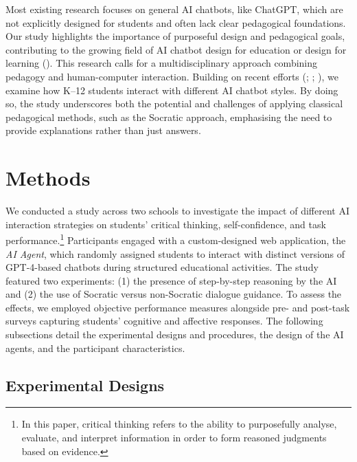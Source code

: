 \documentclass[
  12pt,
]{article}
\begin{document}
Most existing research focuses on general AI chatbots, like ChatGPT, which are not explicitly designed for students and often lack clear pedagogical foundations. Our study highlights the importance of purposeful design and pedagogical goals, contributing to the growing field of AI chatbot design for education or design for learning (). This research calls for a multidisciplinary approach combining pedagogy and human-computer interaction. Building on recent efforts (; ; ), we examine how K--12 students interact with different AI chatbot styles. By doing so, the study underscores both the potential and challenges of applying classical pedagogical methods, such as the Socratic approach, emphasising the need to provide explanations rather than just answers.

\section{Methods}\label{sec:methods}

We conducted a study across two schools to investigate the impact of different AI interaction strategies on students' critical thinking, self-confidence, and task performance.\footnote{
  In this paper, critical thinking refers to the ability to purposefully analyse, evaluate, and interpret information in order to form reasoned judgments based on evidence.} Participants engaged with a custom-designed web application, the \emph{AI Agent}, which randomly assigned students to interact with distinct versions of GPT-4-based chatbots during structured educational activities. The study featured two experiments: (1) the presence of step-by-step reasoning by the AI and (2) the use of Socratic versus non-Socratic dialogue guidance. To assess the effects, we employed objective performance measures alongside pre- and post-task surveys capturing students' cognitive and affective responses. The following subsections detail the experimental designs and procedures, the design of the AI agents, and the participant characteristics.

\subsection{Experimental Designs}\label{experimental-designs}
\end{document}
